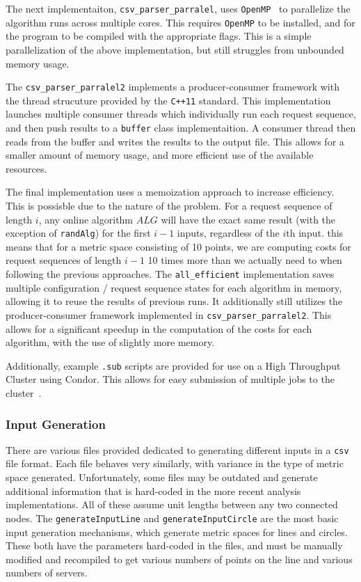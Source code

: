 The next implementaiton, \texttt{csv\_parser\_parralel}, uses \texttt{OpenMP}~\cite{openmp08} to parallelize the algorithm runs across multiple cores. This requires \texttt{OpenMP} to be installed, and for the program to be compiled with the appropriate flags. This is a simple parallelization of the above implementation, but still struggles from unbounded memory usage.

The \texttt{csv\_parser\_parralel2} implements a producer-consumer framework with the thread strucuture provided by the \texttt{C++11} standard. This implementation launches multiple consumer threads which individually run each request sequence, and then push results to a \texttt{buffer} class implementaition. A consumer thread then reads from the buffer and writes the results to the output file. This allows for a smaller amount of memory usage, and more efficient use of the available resources.


The final implementation uses a memoization approach to increase efficiency. This is possisble due to the nature of the \KS problem. For a request sequence of length $i$, any online algorithm $ALG$ will have the exact same result (with the exception of \texttt{randAlg}) for the first $i-1$ inputs, regardless of the $i$th input. this means that for a metric space consisting of 10 points, we are computing costs for request sequences of length $i-1$ 10 times more than we actually need to when following the previous approaches. The \texttt{all\_efficient} implementation saves multiple configuration / request sequence states for each algorithm in memory, allowing it to reuse the results of previous runs. It additionally still utilizes the producer-consumer framework implemented in \texttt{csv\_parser\_parralel2}. This allows for a significant speedup in the computation of the costs for each algorithm, with the use of slightly more memory.

Additionally, example \texttt{.sub} scripts are provided for use on a High Throughput Cluster using Condor. This allows for easy submission of multiple jobs to the cluster~\cite{htcondor}. 

\subsubsection*{Input Generation}

There are various files provided dedicated to generating different inputs in a \texttt{csv} file format. Each file behaves very similarly, with variance in the type of metric space generated. Unfortunately, some files may be outdated and generate additional information that is hard-coded in the more recent analysis implementations. All of these assume unit lengths between any two connected nodes. The \texttt{generateInputLine} and \texttt{generateInputCircle} are the most basic input generation mechanisms, which generate metric spaces for lines and circles. These both have the parameters hard-coded in the files, and must be manually modified and recompiled to get various numbers of points on the line and various numbers of servers.

